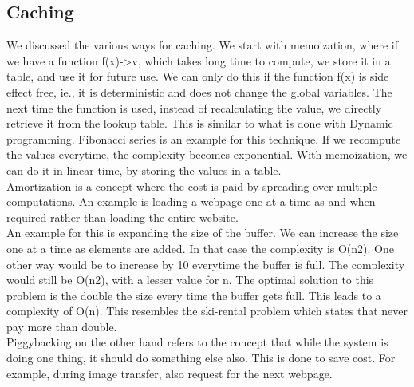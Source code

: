\documentclass[twoside]{article}
\begin{document}
\subsection{Caching}
We discussed the various ways for caching. We start with memoization, where if we have a function f(x)->v, which takes long time to compute, we store it in a table, and use it for future use. We can only do this if the function f(x) is side effect free, ie., it is deterministic and does not change the global variables. The next time the function is used, instead of recalculating the value, we directly retrieve it from the lookup table. This is similar to what is done with Dynamic programming. Fibonacci series is an example for this technique. If we recompute the values everytime, the complexity becomes exponential. With memoization, we can do it in linear time, by storing the values in a table. \\
Amortization is a concept where the cost is paid by spreading over multiple computations. An example is loading a webpage one at a time as and when required rather than loading the entire website. \\
An example for this is expanding the size of the buffer. We can increase the size one at a time as elements are added. In that case the complexity is O(n2). One other way would be to increase by 10 everytime the buffer is full. The complexity would still be O(n2), with a lesser value for n. The optimal solution to this problem is the double the size every time the buffer gets full. This leads to a complexity of O(n). This resembles the ski-rental problem which states that never pay more than double.\\
Piggybacking on the other hand refers to the concept that while the system is doing one thing, it should do something else also. This is done to save cost. For example, during image transfer, also request for the next webpage.
\end{document}
